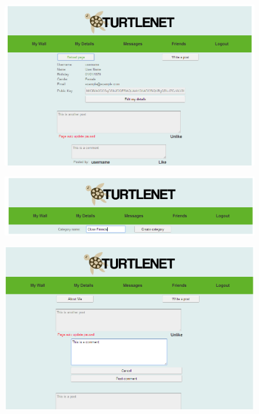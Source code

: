 \begin{centering}
\begin{figure}[p] \includegraphics[scale=0.5]{images/screenshots/crop4.png} \end{figure}
\begin{figure}[p] \includegraphics[scale=0.5]{images/screenshots/crop5.png} \end{figure}
\begin{figure}[p] \includegraphics[scale=0.5]{images/screenshots/crop6.png} \end{figure}

\end{centering}
